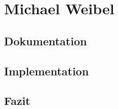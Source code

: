 \section{Michael Weibel}

\subsection*{Dokumentation}

\subsection*{Implementation}

\subsection*{Fazit}
